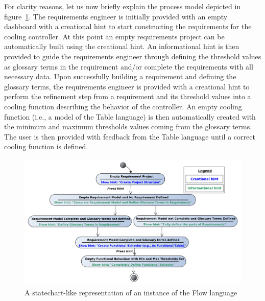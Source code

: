 For clarity reasons, let us now briefly explain the process model depicted in
figure~\ref{fig:flow_statechart}. The requirements engineer is initially
provided with an empty dashboard with a creational hint to start constructing
the requirements for the cooling controller.
At this point an empty requirements project can be automatically built using the
creational hint. An informational hint is then provided to guide the
requirements engineer through defining the threshold values as glossary terms in
the requirement and/or complete the requirements with all necessary data.
Upon successfully building a requirement and defining the glossary terms, the
requirements engineer is provided with a creational hint to perform the
refinement step from a requirement and its threshold values into a cooling
function describing the behavior of the controller.
An empty cooling function (i.e., a model of the \textsf{Table} language) is then
automatically created with the minimum and maximum thresholds values coming from
the glossary terms. The user is then provided with feedback from the
\textsf{Table} language until a correct cooling function is defined.


\begin{figure}[!h]
\centering
\includegraphics[width=1\textwidth]{./figures/FlowChart_V2.pdf}
\caption{A statechart-like representation of an instance of the \textsf{Flow}
language}
\label{fig:flow_statechart}
\end{figure}


